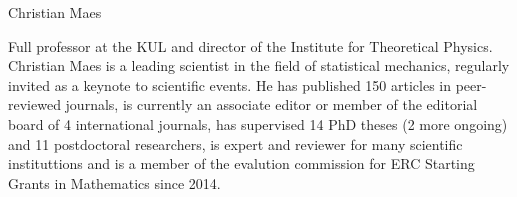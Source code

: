 \begin{participant}[type=PI,PM=12,gender=male,salary=5500]{Christian Maes}

Full professor at the KUL and director of the Institute for Theoretical Physics.
%
Christian Maes is a leading scientist in the field of statistical mechanics, regularly
invited as a keynote to scientific events.
%
He has published 150 articles in peer-reviewed journals,
is currently an associate editor or member of the editorial board of 4 international journals,
has supervised 14 PhD theses (2 more ongoing) and 11 postdoctoral researchers,
is expert and reviewer for many scientific instituttions and
is a member of the evalution commission for ERC Starting Grants in Mathematics since 2014.

\end{participant}

